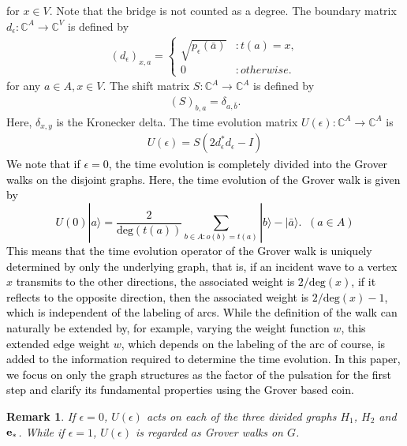 \documentclass[12pt]{article}
\newtheorem{remark}{Remark}
\numberwithin{lemma}{section}
\numberwithin{proposition}{section}
\numberwithin{remark}{section}
\numberwithin{definition}{section}
\newcommand{\red}{\textcolor{black}}
\begin{document}
for $x \in V$. Note that the bridge is not counted as a degree.
The boundary matrix $d_{\epsilon}: \mathbb{C}^{A} \rightarrow \mathbb{C}^{V}$ is defined by
\begin{align*}
    (d_{\epsilon})_{x, a}=
    \begin{cases}
        \sqrt{p_{\epsilon}(\bar{a})} &: t(a)=x, \\
        0 &: otherwise.
    \end{cases}
\end{align*}
for any $a \in A, x \in V$.
The shift matrix $S: \mathbb{C}^{A}\rightarrow \mathbb{C}^{A}$ is defined by
\begin{align*}
    (S)_{b,a}=\delta_{a,\bar{b}}.
\end{align*}
Here, $\delta_{x,y}$ is the Kronecker delta.
The time evolution matrix $U(\epsilon) : \mathbb{C}^{A}\rightarrow \mathbb{C}^{A}$ is
\begin{align*}
U(\epsilon)=S(2d_{\epsilon}^{*}d_{\epsilon}-I)
\end{align*}
\red{We note that if $\epsilon=0$, the time evolution is completely divided into the Grover walks on the disjoint graphs. Here, the time evolution of the Grover walk is given by
\[ U(0)|a\rangle=\frac{2}{\mathrm{deg}(t(a))}\sum_{b\in A:o(b)=t(a)}|b\rangle - |\bar{a}\rangle.\;\;(a\in A)  \]
This means that the time evolution operator of the Grover walk is uniquely determined by  only the underlying graph, that is, if an incident wave to a vertex $x$ transmits to the other directions, the associated weight is $2/\mathrm{deg}(x)$, if it reflects to the opposite direction, then the associated weight is $2/\mathrm{deg}(x)-1$, which is independent of the labeling of arcs. 
}
\red{
While the definition of the walk can naturally be extended by, for example,  varying the weight function $w$, this extended edge weight $w$, which depends on the labeling of the arc of course, is added to the information required to determine the time evolution.
\red{In this paper, we focus on only the graph structures as the factor of the pulsation for the first step and clarify its fundamental properties using  the Grover based coin.}
}
\begin{remark}
    If $\epsilon=0$, $U(\epsilon)$ acts on each of the three divided graphs $H_1$, $H_2$ and $\bold{e}_{*}$. While if $\epsilon=1$, $U(\epsilon)$ is regarded as Grover walks on $G$.
\end{remark}
\end{document}
